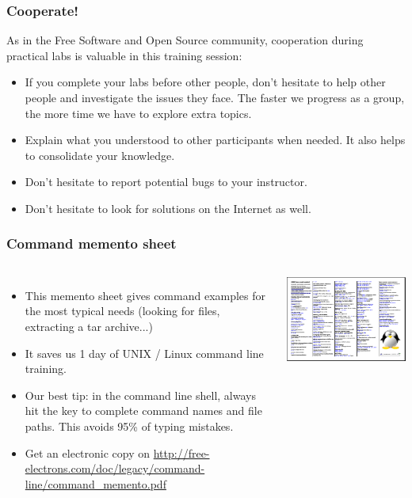 \begin{frame}
\frametitle{Cooperate!}
As in the Free Software and Open Source community,
cooperation during practical labs is valuable in this training session:
\begin{itemize}
\item If you complete your labs before other people, don't hesitate to help
other people and investigate the issues they face. The faster we progress as a
group, the more time we have to explore extra topics.
\item Explain what you understood to other participants when needed.
It also helps to consolidate your knowledge.
\item Don't hesitate to report potential bugs to your instructor.
\item Don't hesitate to look for solutions on the Internet as well.
\end{itemize}
\end{frame}

\begin{frame}
  \frametitle{Command memento sheet}
  \begin{columns}
    \begin{itemize}
       \item This memento sheet gives command examples for the most
       typical needs (looking for files, extracting a tar archive...)
       \item It saves us 1 day of UNIX / Linux command line training.
       \item Our best tip: in the command line shell, always hit the
        key to complete command names and file paths.
       This avoids 95\% of typing mistakes.
       \item Get an electronic copy on
       \url{http://free-electrons.com/doc/legacy/command-line/command_memento.pdf}
    \end{itemize}
    \includegraphics[width=\textwidth]{slides/course-information/command_memento.png}
  \end{columns}
\end{frame}

